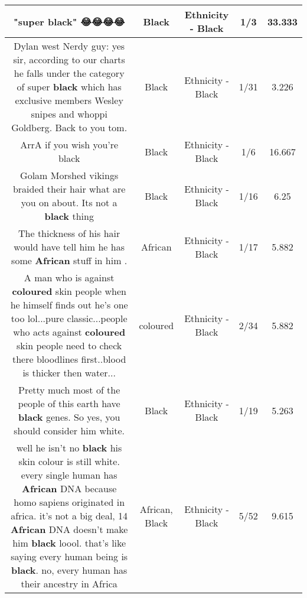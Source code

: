 \documentclass[11pt]{article}
\newlength\mylength
\begin{document}
\begin{center}
\begin{longtable}{|C{.65\mylength}|C{.30\mylength}|C{.12\mylength}|C{.12\mylength}|C{.12\mylength}|}
  \small "super \textbf{black}" 😂😂😂😂\normalsize   & Black & Ethnicity - Black & 1/3 & 33.333 \\  \hline
  \small Dylan west Nerdy guy: yes sir, according to our charts he falls under the category of super \textbf{black} which has exclusive members Wesley snipes and whoppi Goldberg. Back to you tom.\normalsize   & Black & Ethnicity - Black & 1/31 & 3.226 \\  \hline
  \small ArrA if you wish you're black\normalsize   & Black & Ethnicity - Black & 1/6 & 16.667 \\  \hline
  \small Golam Morshed vikings braided their hair what are you on about. Its not a \textbf{black} thing\normalsize   & Black & Ethnicity - Black & 1/16 & 6.25 \\  \hline
  \small The thickness of his hair would have tell him he has some \textbf{African} stuff in him .\normalsize   & African & Ethnicity - Black & 1/17 & 5.882 \\  \hline
  \small A man who is against \textbf{coloured} skin people when he himself finds out he's one too lol...pure classic...people who acts against \textbf{coloured} skin people need to check there bloodlines first..blood is thicker then water...\normalsize   & coloured & Ethnicity - Black & 2/34 & 5.882 \\  \hline
  \small Pretty much most of the people of this earth have \textbf{black} genes. So yes, you should consider him white.\normalsize   & Black & Ethnicity - Black & 1/19 & 5.263 \\  \hline
  \small well he isn't no \textbf{black} his skin colour is still white. every single human has \textbf{African} DNA because homo sapiens originated in africa. it's not a big deal, 14 \textbf{African} DNA doesn't make him \textbf{black} loool. that's like saying every human being is \textbf{black}. no, every human has their ancestry in Africa\normalsize   & African, Black & Ethnicity - Black & 5/52 & 9.615 \\  \hline

\end{longtable}
\end{center}
\end{document}
